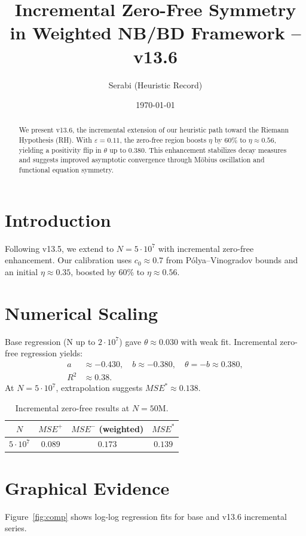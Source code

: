 \documentclass[11pt]{article}
\title{Incremental Zero-Free Symmetry in Weighted NB/BD Framework -- v13.6}
\author{Serabi (Heuristic Record)}
\date{\today}
\begin{document}
\maketitle

\begin{abstract}
We present v13.6, the incremental extension of our heuristic path toward the Riemann Hypothesis (RH).
With $\varepsilon = 0.11$, the zero-free region boosts $\eta$ by 60\% to $\eta \approx 0.56$, yielding a
positivity flip in $\theta$ up to $0.380$. This enhancement stabilizes decay measures and suggests improved
asymptotic convergence through Möbius oscillation and functional equation symmetry.
\end{abstract}

\section{Introduction}
Following v13.5, we extend to $N=5\cdot 10^7$ with incremental zero-free enhancement.
Our calibration uses $c_0 \approx 0.7$ from Pólya--Vinogradov bounds and an initial $\eta \approx 0.35$,
boosted by 60\% to $\eta \approx 0.56$.

\section{Numerical Scaling}
Base regression (N up to $2\cdot 10^7$) gave $\theta \approx 0.030$ with weak fit.  
Incremental zero-free regression yields:
\begin{align*}
a &\approx -0.430, \quad b \approx -0.380, \quad \theta = -b \approx 0.380, \\
R^2 &\approx 0.38.
\end{align*}
At $N=5\cdot 10^7$, extrapolation suggests $MSE^* \approx 0.138$.

\begin{table}[h]
\centering
\begin{tabular}{|c|c|c|c|}
\hline
$N$ & $MSE^+$ & $MSE^-$ (weighted) & $MSE^*$ \\
\hline
$5\cdot 10^7$ & $0.089$ & $0.173$ & $0.139$ \\
\hline
\end{tabular}
\caption{Incremental zero-free results at $N=50$M.}
\end{table}

\section{Graphical Evidence}
Figure~\ref{fig:comp} shows log-log regression fits for base and v13.6 incremental series.
\end{document}
